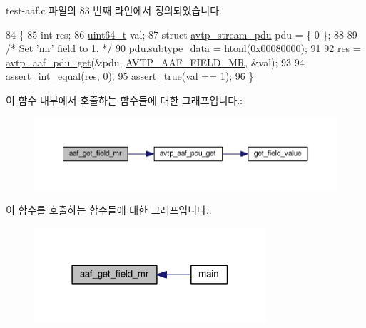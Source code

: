 test-\/aaf.\+c 파일의 83 번째 라인에서 정의되었습니다.


\begin{DoxyCode}
84 \{
85     \textcolor{keywordtype}{int} res;
86     \hyperlink{parse_8c_aec6fcb673ff035718c238c8c9d544c47}{uint64\_t} val;
87     \textcolor{keyword}{struct }\hyperlink{structavtp__stream__pdu}{avtp\_stream\_pdu} pdu = \{ 0 \};
88 
89     \textcolor{comment}{/* Set 'mr' field to 1. */}
90     pdu.\hyperlink{structavtp__stream__pdu_a3210e9f18fdc9c29cef7600c4d1e67e9}{subtype\_data} = htonl(0x00080000);
91 
92     res = \hyperlink{avtp__aaf_8h_acc4c927b036e22def8e6b6beb3ac6026}{avtp\_aaf\_pdu\_get}(&pdu, \hyperlink{avtp__aaf_8h_a7eaee6c1ebc806c0401dbe7b14cd22dba7eb52ad27551549484048c7c54ff9bf3}{AVTP\_AAF\_FIELD\_MR}, &val);
93 
94     assert\_int\_equal(res, 0);
95     assert\_true(val == 1);
96 \}
\end{DoxyCode}


이 함수 내부에서 호출하는 함수들에 대한 그래프입니다.\+:
\nopagebreak
\begin{figure}[H]
\begin{center}
\leavevmode
\includegraphics[width=350pt]{test-aaf_8c_a193c8c98b601c2f340da5917f0d76aef_cgraph}
\end{center}
\end{figure}




이 함수를 호출하는 함수들에 대한 그래프입니다.\+:
\nopagebreak
\begin{figure}[H]
\begin{center}
\leavevmode
\includegraphics[width=243pt]{test-aaf_8c_a193c8c98b601c2f340da5917f0d76aef_icgraph}
\end{center}
\end{figure}


